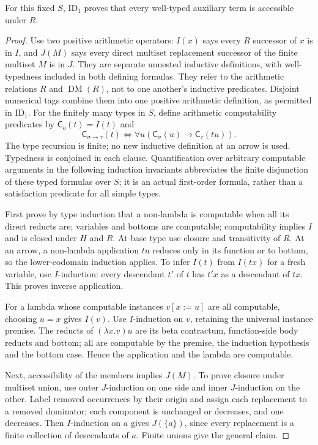\documentclass[11pt,a4paper]{article}
\begin{document}
\begin{lemma}\label{lem:id1}
For this fixed $S$, $\mathrm{ID}_1$ proves that every well-typed auxiliary
term is accessible under $R$.
\end{lemma}
\begin{proof}
Use two positive arithmetic operators: $I(x)$ says every $R$ successor of
$x$ is in $I$, and $J(M)$ says every direct multiset replacement successor
of the finite multiset $M$ is in $J$.  They are separate unnested inductive
definitions, with well-typedness included in both defining formulas.
They refer to the arithmetic relations $R$ and $\operatorname{DM}(R)$,
not to one another's inductive predicates. Disjoint numerical tags combine
them into one positive arithmetic definition, as permitted in
$\mathrm{ID}_1$. For the finitely many types in $S$, define arithmetic
computability predicates by $\mathsf C_o(t)=I(t)$ and
\[
 \mathsf C_{\sigma\to\tau}(t)\iff
       \forall u(\mathsf C_\sigma(u)\to\mathsf C_\tau(tu)).
\]
The type recursion is finite; no new inductive definition at an arrow is used.
Typedness is conjoined in each clause. Quantification over arbitrary
computable arguments in the following induction invariants abbreviates
the finite disjunction of these typed formulas over $S$; it is an actual
first-order formula, rather than a satisfaction predicate for all simple types.

First prove by type induction that a non-lambda is computable when all its
direct reducts are; variables and bottoms are computable; computability implies
$I$ and is closed under $H$ and $R$.  At base type use closure and transitivity
of $R$.  At an arrow, a non-lambda application $tu$ reduces only in its function
or to bottom, so the lower-codomain induction applies.  To infer $I(t)$ from
$I(tx)$ for a fresh variable, use $I$-induction: every descendant $t'$ of $t$
has $t'x$ as a descendant of $tx$.  This proves inverse application.

For a lambda whose computable instances $v[x:=u]$ are all computable, choosing
$u=x$ gives $I(v)$.  Use $I$-induction on $v$, retaining the universal instance
premise.  The reducts of $(\lambda x.v)u$ are its beta contractum,
function-side body reducts and bottom; all are computable by the premise,
the induction hypothesis and the bottom case.  Hence the application and
the lambda are computable.

Next, accessibility of the members implies $J(M)$.  To prove closure under
multiset union, use outer $J$-induction on one side and inner $J$-induction
on the other.  Label removed occurrences by their origin and assign each
replacement to a removed dominator; each component is unchanged or decreases,
and one decreases.  Then $I$-induction on $a$ gives $J(\{a\})$, since every
replacement is a finite collection of descendants of $a$.  Finite unions
give the general claim.


\end{proof}
\end{document}
